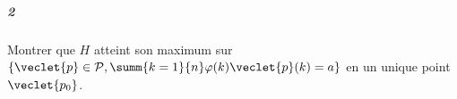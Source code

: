 \message{ !name(exo_supp.tex)}\documentclass[10pt,a4paper]{article} 
\begin{document}
\subparagraph{2} Montrer que $H$ atteint son maximum sur
$\left\lbrace \veclet{p} \in \mathcal{P}, \summ{k=1}{n}\varphi(k) \veclet{p}(k) = a
\right\rbrace$ en un unique point $\veclet{p_0}$. 
\end{document}
